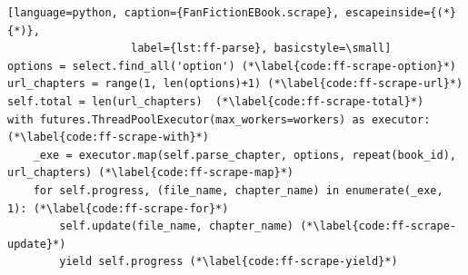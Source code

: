 \documentclass[]{report}   %
\begin{document}
\begin{minipage}{\linewidth}
\begin{lstlisting}[language=python, caption={FanFictionEBook.scrape}, escapeinside={(*}{*)}, 
                   label={lst:ff-parse}, basicstyle=\small]
options = select.find_all('option') (*\label{code:ff-scrape-option}*)
url_chapters = range(1, len(options)+1) (*\label{code:ff-scrape-url}*)
self.total = len(url_chapters)  (*\label{code:ff-scrape-total}*)
with futures.ThreadPoolExecutor(max_workers=workers) as executor: (*\label{code:ff-scrape-with}*)
    _exe = executor.map(self.parse_chapter, options, repeat(book_id), url_chapters) (*\label{code:ff-scrape-map}*)
    for self.progress, (file_name, chapter_name) in enumerate(_exe, 1): (*\label{code:ff-scrape-for}*)
        self.update(file_name, chapter_name) (*\label{code:ff-scrape-update}*)
        yield self.progress (*\label{code:ff-scrape-yield}*)
\end{lstlisting}
\end{minipage}
\end{document}
